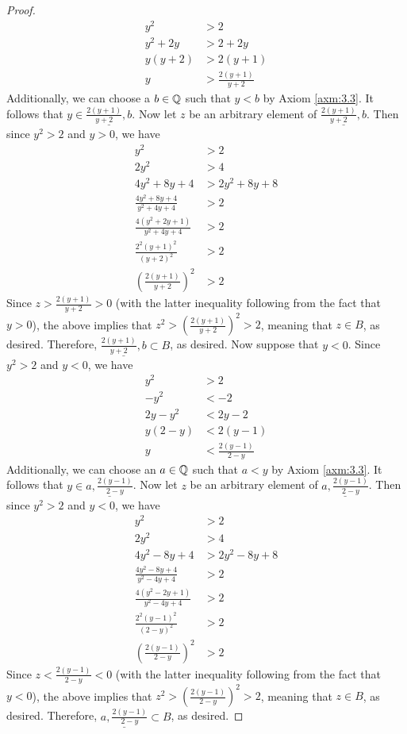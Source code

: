 \documentclass[../main.tex]{subfiles}
\begin{document}
\begin{exercise}
\begin{proof}
        \begin{align*}
            y^2 &> 2\\
            y^2+2y &> 2+2y\\
            y(y+2) &> 2(y+1)\\
            y &> \frac{2(y+1)}{y+2}
        \end{align*}
        Additionally, we can choose a $b\in\mathbb{Q}$ such that $y<b$ by Axiom \ref{axm:3.3}. It follows that $y\in\underline{\frac{2(y+1)}{y+2},b}$. Now let $z$ be an arbitrary element of $\underline{\frac{2(y+1)}{y+2},b}$. Then since $y^2>2$ and $y>0$, we have
        \begin{align*}
            y^2 &> 2\\
            2y^2 &> 4\\
            4y^2+8y+4 &> 2y^2+8y+8\\
            \frac{4y^2+8y+4}{y^2+4y+4} &> 2\\
            \frac{4(y^2+2y+1)}{y^2+4y+4} &> 2\\
            \frac{2^2(y+1)^2}{(y+2)^2} &> 2\\
            \left( \frac{2(y+1)}{y+2} \right)^2 &> 2
        \end{align*}
        Since $z>\frac{2(y+1)}{y+2}>0$ (with the latter inequality following from the fact that $y>0$), the above implies that $z^2>\left( \frac{2(y+1)}{y+2} \right)^2>2$, meaning that $z\in B$, as desired. Therefore, $\underline{\frac{2(y+1)}{y+2},b}\subset B$, as desired. Now suppose that $y<0$. Since $y^2>2$ and $y<0$, we have
        \begin{align*}
            y^2 &> 2\\
            -y^2 &< -2\\
            2y-y^2 &< 2y-2\\
            y(2-y) &< 2(y-1)\\
            y &< \frac{2(y-1)}{2-y}
        \end{align*}
        Additionally, we can choose an $a\in\mathbb{Q}$ such that $a<y$ by Axiom \ref{axm:3.3}. It follows that $y\in\underline{a,\frac{2(y-1)}{2-y}}$. Now let $z$ be an arbitrary element of $\underline{a,\frac{2(y-1)}{2-y}}$. Then since $y^2>2$ and $y<0$, we have
        \begin{align*}
            y^2 &> 2\\
            2y^2 &> 4\\
            4y^2-8y+4 &> 2y^2-8y+8\\
            \frac{4y^2-8y+4}{y^2-4y+4} &> 2\\
            \frac{4(y^2-2y+1)}{y^2-4y+4} &> 2\\
            \frac{2^2(y-1)^2}{(2-y)^2} &> 2\\
            \left( \frac{2(y-1)}{2-y} \right)^2 &> 2
        \end{align*}
        Since $z<\frac{2(y-1)}{2-y}<0$ (with the latter inequality following from the fact that $y<0$), the above implies that $z^2>\left( \frac{2(y-1)}{2-y} \right)^2>2$, meaning that $z\in B$, as desired. Therefore, $\underline{a,\frac{2(y-1)}{2-y}}\subset B$, as desired.\par\medskip


\end{proof}
\end{exercise}
\end{document}
